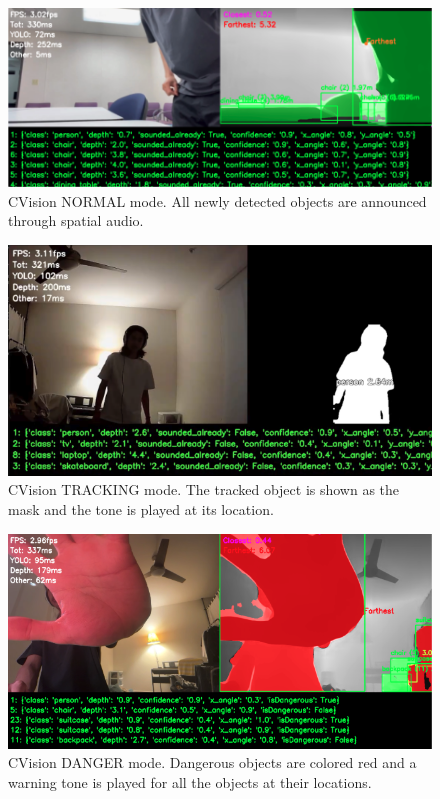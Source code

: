 \documentclass[12pt,a4paper]{article}
\begin{document}
\begin{figure}[ht!]
    \center
    \includegraphics[width=1\linewidth]{normal_mode.png}
    \caption{CVision NORMAL mode. All newly detected objects are announced through spatial audio.}
    \label{normal_mode}
  \end{figure}

\newpage
\begin{figure}[ht!]
    \center
    \includegraphics[width=1\linewidth]{tracking_mode.png}
    \caption{CVision TRACKING mode. The tracked object is shown as the mask and the tone is played at its location.}
    \label{tracking_mode}
  \end{figure}


  \begin{figure}[ht!]
    \center
    \includegraphics[width=1\linewidth]{danger_mode.png}
    \caption{CVision DANGER mode. Dangerous objects are colored red and a warning tone is played for all the objects at their locations.}
    \label{danger_mode}
  \end{figure}
\end{document}

